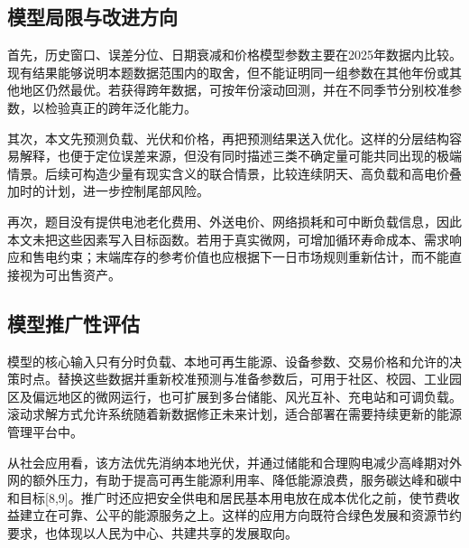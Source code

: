 \subsection{模型局限与改进方向}

首先，历史窗口、误差分位、日期衰减和价格模型参数主要在2025年数据内比较。现有结果能够说明本题数据范围内的取舍，但不能证明同一组参数在其他年份或其他地区仍然最优。若获得跨年数据，可按年份滚动回测，并在不同季节分别校准参数，以检验真正的跨年泛化能力。

其次，本文先预测负载、光伏和价格，再把预测结果送入优化。这样的分层结构容易解释，也便于定位误差来源，但没有同时描述三类不确定量可能共同出现的极端情景。后续可构造少量有现实含义的联合情景，比较连续阴天、高负载和高电价叠加时的计划，进一步控制尾部风险。

再次，题目没有提供电池老化费用、外送电价、网络损耗和可中断负载信息，因此本文未把这些因素写入目标函数。若用于真实微网，可增加循环寿命成本、需求响应和售电约束；末端库存的参考价值也应根据下一日市场规则重新估计，而不能直接视为可出售资产。


\subsection{模型推广性评估}

模型的核心输入只有分时负载、本地可再生能源、设备参数、交易价格和允许的决策时点。替换这些数据并重新校准预测与准备参数后，可用于社区、校园、工业园区及偏远地区的微网运行，也可扩展到多台储能、风光互补、充电站和可调负载。滚动求解方式允许系统随着新数据修正未来计划，适合部署在需要持续更新的能源管理平台中。

从社会应用看，该方法优先消纳本地光伏，并通过储能和合理购电减少高峰期对外网的额外压力，有助于提高可再生能源利用率、降低能源浪费，服务碳达峰和碳中和目标[8,9]。推广时还应把安全供电和居民基本用电放在成本优化之前，使节费收益建立在可靠、公平的能源服务之上。这样的应用方向既符合绿色发展和资源节约要求，也体现以人民为中心、共建共享的发展取向。
